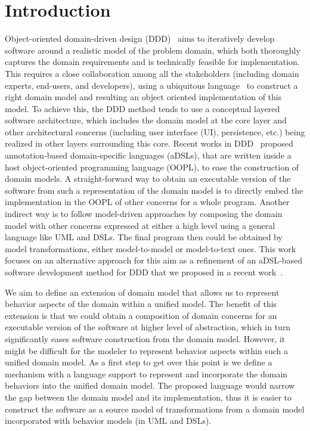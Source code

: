 %
\section{Introduction}\label{sect:introduction}
Object-oriented domain-driven design (DDD)~\cite{evans_domain-driven_2004} aims to iteratively develop software around a realistic model of the problem domain, which both thoroughly captures the domain requirements and is technically feasible for implementation. This requires a close collaboration among all the stakeholders (including domain experts, end-users, and developers), using a ubiquitous language~\cite{evans_domain-driven_2004} to construct a right domain model and resulting an object oriented implementation of this model. To achieve this, the DDD method tends to use a conceptual layered software architecture, which includes the domain model at the core layer and other architectural concerns (including user interface (UI), persistence, etc.) being realized in other layers surrounding this core. %
%
%
Recent works in DDD~\cite{dan_haywood_apache_2013, paniza_learn_2011} proposed  annotation-based domain-specific languages (aDSLs), that are written inside a host object-oriented programming language (OOPL), to ease the construction of domain models. A straight-forward way to obtain an executable version of the software from such a representation of the domain model is to directly embed the implementation in the OOPL of other concerns for a whole program. Another indirect way is to follow model-driven approaches by composing the domain model with other concerns expressed at either a high level using a general language like UML and DSLs. The final program then could be obtained by model transformations, either model-to-model or model-to-text ones. This work focuses on an alternative approach for this aim as a refinement of an aDSL-based software development method for DDD that we proposed in a recent work~\cite{le_domain_2018}. 

We aim to define an extension of domain model that allows us to represent behavior aspects of the domain within a unified model. The benefit of this extension is that we could obtain a composition of domain concerns for an executable version of the software at higher level of abstraction, which in turn significantly eases software construction from the domain model. However, it might be difficult for the modeler to represent behavior aspects within such a unified domain model. As a first step to get over this point is we define a mechanism with a language support to represent and incorporate the domain behaviors into the unified domain model. The proposed language would narrow the gap between the domain model and its implementation, thus it is easier to construct the software as a source model of transformations from a domain model incorporated with behavior models (in UML and DSLs).

